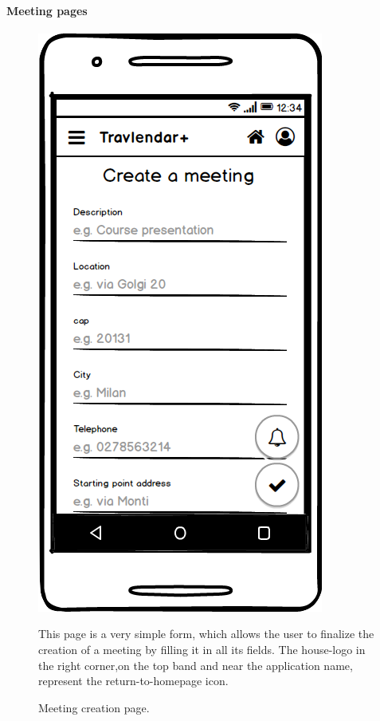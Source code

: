 \paragraph{Meeting pages}
	\begin{figure}
		\centering
		\includegraphics[width=0.6\linewidth]{mockups/CreateMeeting}
		\caption{Meeting creation page.}
		\label{fig:createmeeting}
		\begin{center}
			This page is a very simple form, which allows the user to finalize the creation of a meeting by filling it in all its fields. 
			The house-logo in the  right corner,on the top band and near the application name, represent the return-to-homepage icon. 
		\end{center}
	\end{figure}

